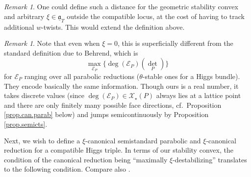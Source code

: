 \documentclass[openany]{amsbook}
\theoremstyle{definition}
\theoremstyle{remark}
\newtheorem{remark}[theorem]{Remark}
\numberwithin{equation}{section}
\newcommand{\cE}{\mathcal{E}}
\newcommand{\cX}{\mathcal{X}}
\newcommand{\ul}[1]{\underline{#1}}
\renewcommand{\-}{\operatorname{-}}
\renewcommand{\a}{\mathfrak{a}}
\newcommand{\ga}{\ul{\a}}
\begin{document}
\begin{remark}
    One could define such a distance for the geometric stability convex and arbitrary $\xi \in \ga_T$ outside the compatible locus, at the cost of having to track additional $w$-twists. This would extend the definition above.
\end{remark}

\begin{remark}
    Note that even when $\xi = 0$, this is superficially different from the standard definition due to Behrend, which is
    $$\max_{\cE_P} \{\deg(\cE_P)(\det_P) \}$$
    for $\cE_P$ ranging over all parabolic reductions ($\theta$-stable ones for a Higgs bundle). They encode basically the same information. Though ours is a real number, it takes discrete values (since $\deg(\cE_P) \in \cX_\star(P)$ always lies at a lattice point and there are only finitely many possible face directions, cf.\ Proposition \ref{prop.can.parab} below) and jumps semicontinuously by Proposition \ref{prop.semicts}. 
\end{remark}

Next, we wish to define a $\xi$-canonical semistandard parabolic and $\xi$-canonical reduction for a compatible Higgs triple. In terms of our stability convex, the condition of the canonical reduction being ``maximally $\xi$-destabilizing'' translates to the following condition. Compare also \cite[Prop. 3.13]{behrendsemistable}.
\end{document}
